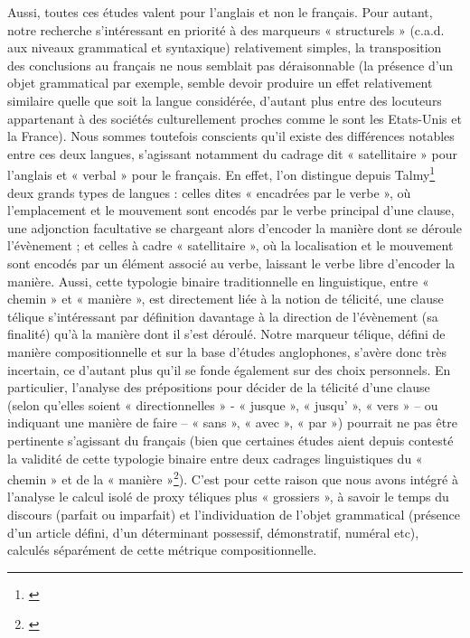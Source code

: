 Aussi, toutes ces études valent pour l’anglais et non le français. Pour autant, notre recherche s’intéressant en priorité à des marqueurs  « structurels » (c.a.d. aux niveaux grammatical et syntaxique) relativement simples, la transposition des conclusions au français ne nous semblait pas déraisonnable (la présence d’un objet grammatical par exemple, semble devoir produire un effet relativement similaire quelle que soit la langue considérée, d’autant plus entre des locuteurs appartenant à des sociétés culturellement proches comme le sont les Etats-Unis et la France). Nous sommes toutefois conscients qu'il existe des différences notables entre ces deux langues, s’agissant notamment du cadrage dit  « satellitaire » pour l'anglais et  « verbal » pour le français. En effet, l’on distingue depuis Talmy\footnote{\cite{talmy_path_1991}} deux grands types de langues : celles dites  « encadrées par le verbe », où l'emplacement et le mouvement sont encodés par le verbe principal d'une clause, une adjonction facultative se chargeant alors d’encoder la manière dont se déroule l’évènement  ; et celles à cadre  « satellitaire », où la localisation et le mouvement sont encodés par un élément associé au verbe, laissant le verbe libre d’encoder la manière. Aussi, cette typologie binaire traditionnelle en linguistique, entre  « chemin » et  « manière », est directement liée à la notion de télicité, une clause télique s’intéressant par définition davantage à la direction de l’évènement (sa finalité) qu’à la manière dont il s’est déroulé. Notre marqueur télique, défini de manière compositionnelle et sur la base d’études anglophones, s’avère donc très incertain, ce d’autant plus qu’il se fonde également sur des choix personnels. En particulier, l’analyse des prépositions pour décider de la télicité d’une clause (selon qu’elles soient  « directionnelles » -  « jusque »,  « jusqu' »,  « vers » – ou indiquant une manière de faire –  « sans »,  « avec »,  « par ») pourrait ne pas être pertinente s’agissant du français (bien que certaines études aient depuis contesté la validité de cette typologie binaire entre deux cadrages linguistiques du  « chemin » et de la  « manière »\footnote{\cite{egan_manner_2015}}). C’est pour cette raison que nous avons intégré à l’analyse le calcul isolé de proxy téliques plus  « grossiers », à savoir le temps du discours (parfait ou imparfait) et l’individuation de l’objet grammatical (présence d’un article défini, d’un déterminant possessif, démonstratif, numéral etc), calculés séparément de cette métrique compositionnelle.

